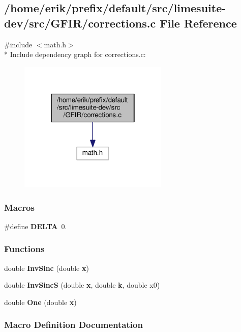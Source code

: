 \subsection{/home/erik/prefix/default/src/limesuite-\/dev/src/\+G\+F\+I\+R/corrections.c File Reference}
\label{corrections_8c}
{\ttfamily \#include $<$math.\+h$>$}\\*
Include dependency graph for corrections.\+c\+:
\nopagebreak
\begin{figure}[H]
\begin{center}
\leavevmode
\includegraphics[width=202pt]{d1/d11/corrections_8c__incl}
\end{center}
\end{figure}
\subsubsection*{Macros}
\begin{DoxyCompactItemize}
\item 
\#define {\bf D\+E\+L\+TA}~0.
\end{DoxyCompactItemize}
\subsubsection*{Functions}
\begin{DoxyCompactItemize}
\item 
double {\bf Inv\+Sinc} (double {\bf x})
\item 
double {\bf Inv\+SincS} (double {\bf x}, double {\bf k}, double x0)
\item 
double {\bf One} (double {\bf x})
\end{DoxyCompactItemize}


\subsubsection{Macro Definition Documentation}
